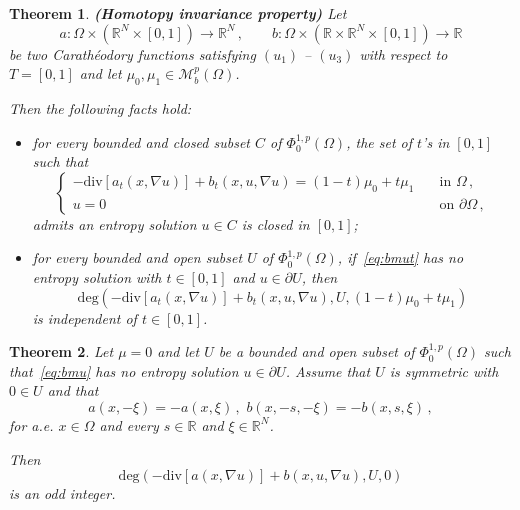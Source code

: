 \documentclass[twoside,reqno]{amsart}
\numberwithin{equation}{section}
\newtheorem{thm}{Theorem}[section]
\theoremstyle{definition}
\newcommand{\R}{\mathbb{R}}
\begin{document}
%
\begin{thm}
\label{thm:homotopy}
\textbf{\emph{(Homotopy invariance property)}}
Let
\[
a:\Omega\times(\R^N\times[0,1])\rightarrow \R^N\,,\qquad
b:\Omega\times(\R\times\R^N\times[0,1])\rightarrow \R
\]
be two Carath\'eodory functions satisfying $(u_1)$ -- $(u_3)$
with respect to $T=[0,1]$ and let
$\mu_0, \mu_1\in\mathcal{M}_b^p(\Omega)$.
\par
Then the following facts hold:
\begin{itemize}
\item[$(a)$]
for every bounded and closed subset $C$ of $\Phi^{1,p}_0(\Omega)$,
the set of $t$'s in $[0,1]$ such that
\begin{equation}
\label{eq:bmut}
\begin{cases}
- \mathrm{div}[a_t(x,\nabla u)] + b_t(x,u,\nabla u)=
(1-t)\mu_0 + t\mu_1
&\quad\text{in $\Omega$}\,,\\
u=0
&\quad\text{on $\partial\Omega$}\,,
\end{cases}
\end{equation}
admits an entropy solution $u\in C$ is closed in $[0,1]$;
\item[$(b)$]
for every bounded and open subset $U$ of $\Phi^{1,p}_0(\Omega)$,
if~\eqref{eq:bmut} has no entropy solution 
with $t\in[0,1]$ and $u\in\partial U$, then
\[
\mathrm{deg}(- \mathrm{div}[a_t(x,\nabla u)]
+ b_t(x,u,\nabla u),U,(1-t)\mu_0+t\mu_1)
\]
is independent of $t\in[0,1]$.
\end{itemize}
\end{thm}
%
\begin{thm}
\label{thm:odd}
Let $\mu=0$ and let $U$ be a bounded 
and open subset of $\Phi^{1,p}_0(\Omega)$ such 
that~\eqref{eq:bmu}
has no entropy solution $u\in\partial U$.
Assume that $U$ is symmetric with $0\in U$ and that
\[
a(x,-\xi) = - a(x,\xi)\,,\,\,
b(x,-s,-\xi) = - b(x,s,\xi)\,,
\]
for a.e. $x\in \Omega$ and every $s\in\R$ and $\xi\in\R^N$.
\par
Then 
\[
\mathrm{deg}(- \mathrm{div}[a(x,\nabla u)] 
+ b(x,u,\nabla u),U,0)
\]
is an odd integer.
\end{thm}
%


\end{document}

